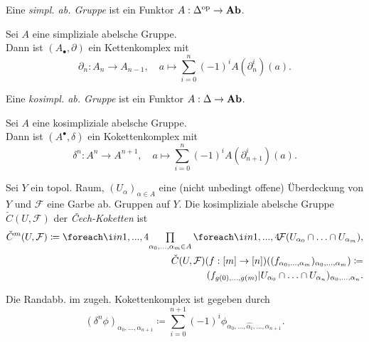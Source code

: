 \documentclass{cheat-sheet}
\newcommand{\nspace}[1]{\foreach \i in {1,...,#1}{ \! }} %
\newcommand{\Fais}{\mathcal{F}} %
\begin{document}


\begin{defn}
  Eine \emph{simpl. ab. Gruppe} ist ein Funktor
  $A : \Delta^{\mathrm{op}} \to \mathbf{Ab}$.
\end{defn}

\begin{defn}
  Sei $A$ eine simpliziale abelsche Gruppe. \\
  Dann ist $(A_\bullet, \partial)$ ein Kettenkomplex mit
  \[
    \partial_n : A_n \to A_{n-1}, \quad
    a \mapsto \sum_{i=0}^n (-1)^i A(\partial_n^i)(a).
  \]
\end{defn}

\begin{defn}
  Eine \emph{kosimpl. ab. Gruppe} ist ein Funktor
  $A : \Delta \to \mathbf{Ab}$.
\end{defn}

\begin{defn}
  Sei $A$ eine kosimpliziale abelsche Gruppe. \\
  Dann ist $(A^\bullet, \delta)$ ein Kokettenkomplex mit
  \[
    \delta^n : A^n \to A^{n+1}, \quad
    a \mapsto \sum_{i=0}^n (-1)^i A(\partial_{n+1}^i)(a).
  \]
\end{defn}


\begin{defn}
  Sei $Y$ ein topol. Raum, $(U_\alpha)_{\alpha \in A}$ eine (nicht unbedingt offene) Überdeckung von $Y$ und $\Fais$ eine Garbe ab. Gruppen auf $Y$. Die kosimpliziale abelsche Gruppe $\check{C}(U, \Fais)$ der \emph{Čech-Koketten} ist
  \begin{align*}
    \check{C}^m(U, \Fais) \coloneqq \nspace{4} \prod_{\alpha_0, \ldots, \alpha_m \in A} \nspace{4} \Fais(U_{\alpha_0} \cap \ldots \cap U_{\alpha_m}), \\
    \check{C}(U, \Fais)(f : [m] \to [n])((f_{\alpha_0, \ldots ,\alpha_m})_{\alpha_0, \ldots, \alpha_m}) \coloneqq \\
    (f_{g(0), \ldots, g(m)}|U_{\alpha_0} \cap \ldots \cap U_{\alpha_n})_{\alpha_0, \nldots, \alpha_n}.
  \end{align*}
\end{defn}

\begin{bem}
  Die Randabb. im zugeh. Kokettenkomplex ist gegeben durch
  \[ (\delta^n \phi)_{\alpha_0, \ldots, \alpha_{n+1}} \coloneqq \sum_{i=0}^{n+1} (-1)^i \phi_{\alpha_0, \ldots, \hat{\alpha_i}, \ldots, \alpha_{n+1}}. \]
\end{bem}
\end{document}
